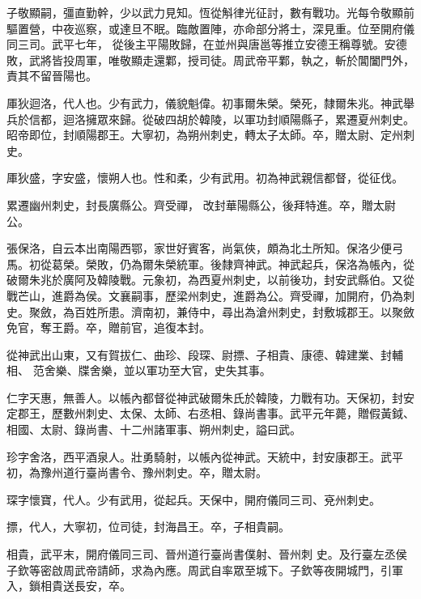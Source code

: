 \begin{pinyinscope}
 子敬顯嗣，彊直勤幹，少以武力見知。恆從斛律光征討，數有戰功。光每令敬顯前驅置營，中夜巡察，或達旦不眠。臨敵置陣，亦命部分將士，深見重。位至開府儀同三司。武平七年，
 從後主平陽敗歸，在並州與唐邕等推立安德王稱尊號。安德敗，武將皆投周軍，唯敬顯走還鄴，授司徒。周武帝平鄴，執之，斬於閶闔門外，責其不留晉陽也。



 厙狄迴洛，代人也。少有武力，儀貌魁偉。初事爾朱榮。榮死，隸爾朱兆。神武舉兵於信都，迴洛擁眾來歸。從破四胡於韓陵，以軍功封順陽縣子，累遷夏州刺史。昭帝即位，封順陽郡王。大寧初，為朔州刺史，轉太子太師。卒，贈太尉、定州刺史。



 厙狄盛，字安盛，懷朔人也。性和柔，少有武用。初為神武親信都督，從征伐。



 累遷幽州刺史，封長廣縣公。齊受禪，
 改封華陽縣公，後拜特進。卒，贈太尉公。



 張保洛，自云本出南陽西鄂，家世好賓客，尚氣俠，頗為北土所知。保洛少便弓馬。初從葛榮。榮敗，仍為爾朱榮統軍。後隸齊神武。神武起兵，保洛為帳內，從破爾朱兆於廣阿及韓陵戰。元象初，為西夏州刺史，以前後功，封安武縣伯。又從戰芒山，進爵為侯。文襄嗣事，歷梁州刺史，進爵為公。齊受禪，加開府，仍為刺史。聚斂，為百姓所患。濟南初，兼侍中，尋出為滄州刺史，封敷城郡王。以聚斂免官，奪王爵。卒，贈前官，追復本封。



 從神武出山東，又有賀拔仁、曲珍、段琛、尉摽、子相貴、康德、韓建業、封輔相、
 范舍樂、牒舍樂，並以軍功至大官，史失其事。



 仁字天惠，無善人。以帳內都督從神武破爾朱氏於韓陵，力戰有功。天保初，封安定郡王，歷數州刺史、太保、太師、右丞相、錄尚書事。武平元年薨，贈假黃鉞、相國、太尉、錄尚書、十二州諸軍事、朔州刺史，謚曰武。



 珍字舍洛，西平酒泉人。壯勇騎射，以帳內從神武。天統中，封安康郡王。武平初，為豫州道行臺尚書令、豫州刺史。卒，贈太尉。



 琛字懷寶，代人。少有武用，從起兵。天保中，開府儀同三司、兗州刺史。



 摽，代人，大寧初，位司徒，封海昌王。卒，子相貴嗣。



 相貴，武平末，開府儀同三司、晉州道行臺尚書僕射、晉州刺
 史。及行臺左丞侯子欽等密啟周武帝請師，求為內應。周武自率眾至城下。子欽等夜開城門，引軍入，鎖相貴送長安，卒。




\end{pinyinscope}

